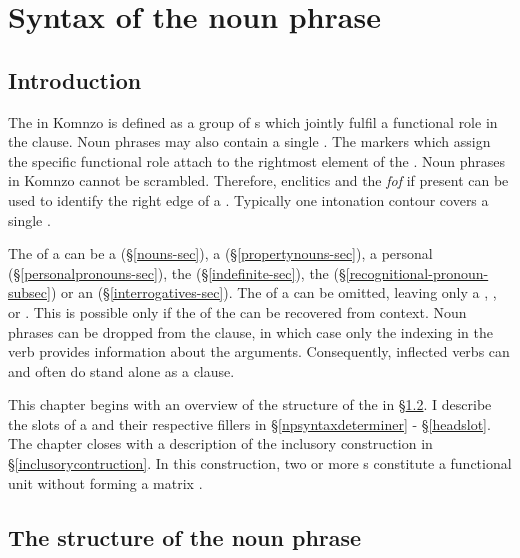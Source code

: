 
\chapter{Syntax of the noun phrase}\label{cha:npsyntax}

\section{Introduction}\label{npsyntax}

The  in Komnzo is defined as a group of s which jointly fulfil a functional role in the clause. Noun phrases may also contain a single . The  markers which assign the specific functional role attach to the rightmost element of the . Noun phrases in Komnzo cannot be scrambled. Therefore,  enclitics and the   \emph{fof} \textendash{} if present \textendash{} can be used to identify the right edge of a . Typically one intonation contour covers a single .

The  of a  can be a  ({\S}\ref{nouns-sec}), a  ({\S}\ref{propertynouns-sec}), a personal  ({\S}\ref{personalpronouns-sec}), the   ({\S}\ref{indefinite-sec}), the   ({\S}\ref{recognitional-pronoun-subsec}) or an  ({\S}\ref{interrogatives-sec}). The  of a  can be omitted, leaving only a , ,  or . This is possible only if the  of the  can be recovered from context. Noun phrases can be dropped from the clause, in which case only the indexing in the verb provides information about the arguments. Consequently, inflected verbs can and often do stand alone as a clause.

This chapter begins with an overview of the structure of the  in {\S}\ref{npstructure}. I describe the slots of a  and their respective fillers in {\S}\ref{npsyntaxdeterminer} - {\S}\ref{headslot}. The chapter closes with a description of the inclusory construction in {\S}\ref{inclusorycontruction}. In this construction, two or more s constitute a functional unit without forming a matrix .

\section{The structure of the noun phrase}\label{npstructure}


